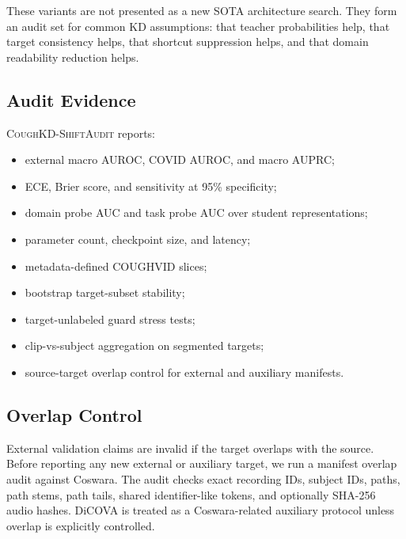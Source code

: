 These variants are not presented as a new SOTA architecture search. They form an audit set for common KD assumptions: that teacher probabilities help, that target consistency helps, that shortcut suppression helps, and that domain readability reduction helps.

\subsection{Audit Evidence}

\textsc{CoughKD-ShiftAudit} reports:
\begin{itemize}
    \item external macro AUROC, COVID AUROC, and macro AUPRC;
    \item ECE, Brier score, and sensitivity at 95\% specificity;
    \item domain probe AUC and task probe AUC over student representations;
    \item parameter count, checkpoint size, and latency;
    \item metadata-defined COUGHVID slices;
    \item bootstrap target-subset stability;
    \item target-unlabeled guard stress tests;
    \item clip-vs-subject aggregation on segmented targets;
    \item source-target overlap control for external and auxiliary manifests.
\end{itemize}

\subsection{Overlap Control}

External validation claims are invalid if the target overlaps with the source. Before reporting any new external or auxiliary target, we run a manifest overlap audit against Coswara. The audit checks exact recording IDs, subject IDs, paths, path stems, path tails, shared identifier-like tokens, and optionally SHA-256 audio hashes. DiCOVA is treated as a Coswara-related auxiliary protocol unless overlap is explicitly controlled.
